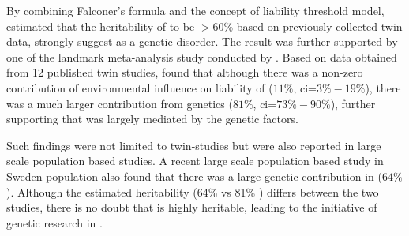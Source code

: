 	By combining Falconer's formula and the concept of liability threshold model, \citet{Gottesman01071967} estimated that the heritability of  to be $>60\%$ based on previously collected twin data, strongly suggest  as a genetic disorder.
	The result was further supported by one of the landmark meta-analysis study conducted by \citet{Sullivan2003}.
	Based on data obtained from 12 published  twin studies, \citet{Sullivan2003} found that although there was a non-zero contribution of environmental influence on liability of  ($11\%$, \gls{ci}=$3\%-19\%$), there was a much larger contribution from genetics ($81\%$, \gls{ci}=$73\%-90\%$), further supporting that  was largely mediated by the genetic factors.
	
	Such findings were not limited to twin-studies but were also reported in large scale population based studies.
	A recent large scale population based study in Sweden population \citep{Lichtenstein2009} also found that there was a large genetic contribution in  ($64\%$).
	Although the estimated heritability (64\% \citep{Lichtenstein2009} vs 81\% \citep{Sullivan2003}) differs between the two studies, there is no doubt that  is highly heritable, leading to the initiative of genetic research in .
	
